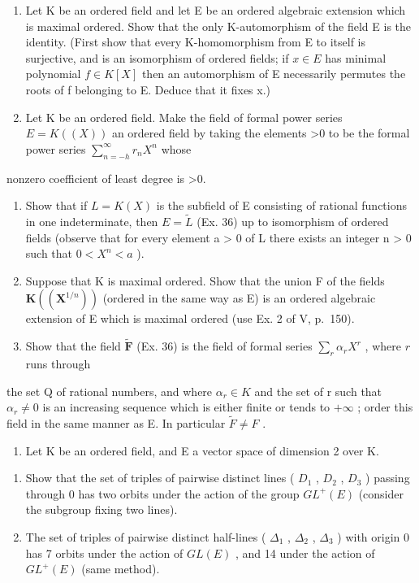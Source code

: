 \begin{enumerate}
\item
  Let K be an ordered field and let E be an ordered algebraic extension which is maximal ordered. Show that the only K-automorphism of the field E is the identity. (First show that every K-homomorphism from E to itself is surjective, and is an isomorphism of ordered fields; if \(x \in E\) has minimal polynomial \(f \in K[X]\) then an automorphism of E necessarily permutes the roots of f belonging to E. Deduce that it fixes x.)
\item
  Let K be an ordered field. Make the field of formal power series \(E = K((X))\) an ordered field by taking the elements \textgreater0 to be the formal power series \(\sum_{n=-h}^{\infty} r_n X^n\) whose
\end{enumerate}

nonzero coefficient of least degree is \textgreater0.

\begin{enumerate}
\def\labelenumi{\alph{enumi})}
\item
  Show that if \(L = K(X)\) is the subfield of E consisting of rational functions in one indeterminate, then \(E = \tilde{L}\) (Ex. 36) up to isomorphism of ordered fields (observe that for every element a \textgreater{} 0 of L there exists an integer n \textgreater{} 0 such that \(0 < X^{n} < a\) ).
\item
  Suppose that K is maximal ordered. Show that the union F of the fields \(\mathbf{K}((\mathbf{X}^{1/n}))\) (ordered in the same way as E) is an ordered algebraic extension of E which is maximal ordered (use Ex. 2 of V, p.~150).
\item
  Show that the field \(\widetilde{\mathbf{F}}\) (Ex. 36) is the field of formal series \(\sum_{r} \alpha_r X^r\) , where \(r\) runs through
\end{enumerate}

the set Q of rational numbers, and where \(\alpha_{r} \in K\) and the set of r such that \(\alpha_{r} \neq 0\) is an increasing sequence which is either finite or tends to \(+\infty\) ; order this field in the same manner as E. In particular \(\widetilde{F} \neq F\) .

\begin{enumerate}
\def\labelenumi{\arabic{enumi})}
\setcounter{enumi}{40}
\tightlist
\item
  Let K be an ordered field, and E a vector space of dimension 2 over K.
\end{enumerate}

\begin{enumerate}
\def\labelenumi{\alph{enumi})}
\item
  Show that the set of triples of pairwise distinct lines ( \(D_{1}\) , \(D_{2}\) , \(D_{3}\) ) passing through 0 has two orbits under the action of the group \(GL^{+}(E)\) (consider the subgroup fixing two lines).
\item
  The set of triples of pairwise distinct half-lines ( \(\Delta_{1}\) , \(\Delta_{2}\) , \(\Delta_{3}\) ) with origin 0 has 7 orbits under the action of \(GL(E)\) , and 14 under the action of \(GL^{+}(E)\) (same method).
\end{enumerate}

